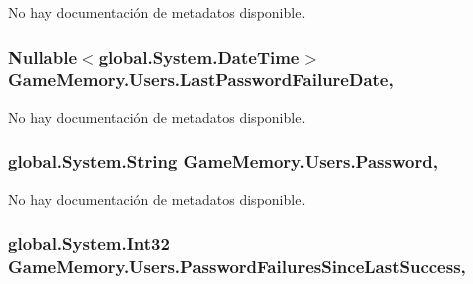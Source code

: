 No hay documentación de metadatos disponible. 

\hypertarget{class_game_memory_1_1_users_a0383048727d3c375e860db6310087196}{
\subsubsection[{Last\-Password\-Failure\-Date}]{\setlength{\rightskip}{0pt plus 5cm}Nullable$<$global.\-System.\-Date\-Time$>$ Game\-Memory.\-Users.\-Last\-Password\-Failure\-Date\hspace{0.3cm}{\ttfamily [get]}, {\ttfamily [set]}}}\label{class_game_memory_1_1_users_a0383048727d3c375e860db6310087196}


No hay documentación de metadatos disponible. 

\hypertarget{class_game_memory_1_1_users_abb226cc2dac045639deb3f1efa109fab}{
\subsubsection[{Password}]{\setlength{\rightskip}{0pt plus 5cm}global.\-System.\-String Game\-Memory.\-Users.\-Password\hspace{0.3cm}{\ttfamily [get]}, {\ttfamily [set]}}}\label{class_game_memory_1_1_users_abb226cc2dac045639deb3f1efa109fab}


No hay documentación de metadatos disponible. 

\hypertarget{class_game_memory_1_1_users_a58dec1e298fb45ba5d9110a151260392}{
\subsubsection[{Password\-Failures\-Since\-Last\-Success}]{\setlength{\rightskip}{0pt plus 5cm}global.\-System.\-Int32 Game\-Memory.\-Users.\-Password\-Failures\-Since\-Last\-Success\hspace{0.3cm}{\ttfamily [get]}, {\ttfamily [set]}}}\label{class_game_memory_1_1_users_a58dec1e298fb45ba5d9110a151260392}



